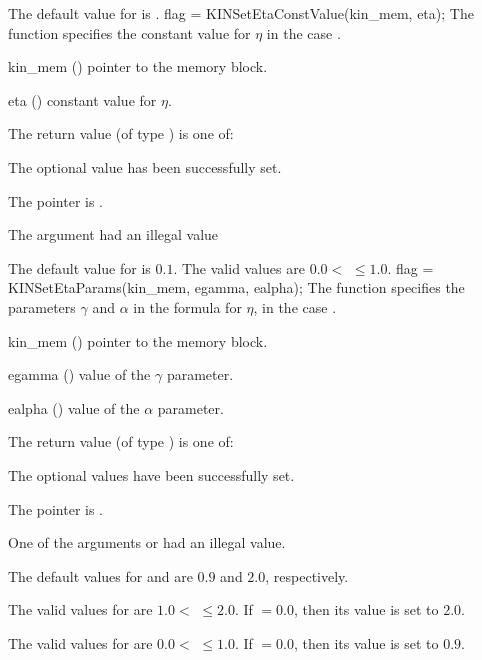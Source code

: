 {
  The default value for  is .
}
{
flag = KINSetEtaConstValue(kin\_mem, eta);
}
{
  The function  specifies the constant value
  for $\eta$ in the case .
}
{
  \begin{args}
  \item[kin\_mem] ()
    pointer to the {\kinsol} memory block.
  \item[eta] ()
    constant value for $\eta$.
  \end{args}
}
{
  The return value  (of type ) is one of:
  \begin{args}
  \item[\Id{KIN\_SUCCESS}] 
    The optional value has been successfully set.
  \item[\Id{KIN\_MEM\_NULL}]
    The  pointer is .
  \item[\Id{KIN\_ILL\_INPUT}]
    The argument  had an illegal value
  \end{args}
}
{
  The default value for  is $0.1$.
  The valid values are $0.0 <$  $\le 1.0$.
}
{
flag = KINSetEtaParams(kin\_mem, egamma, ealpha);
}
{
  The function  specifies the parameters $\gamma$ and
  $\alpha$ in the formula for $\eta$, in the case .
}
{
  \begin{args}
  \item[kin\_mem] ()
    pointer to the {\kinsol} memory block.
  \item[egamma] ()
    value of the $\gamma$ parameter.
  \item[ealpha] ()
    value of the $\alpha$ parameter.
  \end{args}
}
{
  The return value  (of type ) is one of:
  \begin{args}
  \item[\Id{KIN\_SUCCESS}] 
    The optional values have been successfully set.
  \item[\Id{KIN\_MEM\_NULL}]
    The  pointer is .
  \item[\Id{KIN\_ILL\_INPUT}]
    One of the arguments  or  had an illegal value.
  \end{args}
}
{
  The default values for  and  are $0.9$ and $2.0$, respectively.

  The valid values for  are $1.0<$  $\le 2.0$. 
  If  $= 0.0$, then its value is set to $2.0$.

  The valid values for  are $0.0 <$  $\le1.0$.
  If  $= 0.0$, then its value is set to $0.9$.
}
